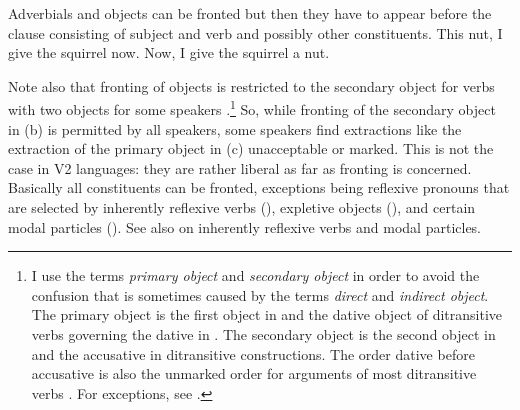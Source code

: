 \eal
{}
\zl 
Adverbials and objects can be fronted but then they have to appear before the clause consisting of
subject and verb and possibly other constituents.
\eal
\ex This nut, I give the squirrel now. 
\ex Now, I give the squirrel a nut.
\zl

Note also that fronting of objects is restricted to the secondary object for verbs with two objects
for some speakers \citep[]{Hudson92a-u}.\footnote{
  I use the terms \emph{primary object} and \emph{secondary
    object} in order to avoid the confusion that is sometimes
  caused by the terms \emph{direct} and \emph{indirect object}. The primary object is the first object in 
  and the dative object of ditransitive verbs governing the dative in . The secondary object
  is the second object in  and the accusative in  ditransitive constructions. The order
  dative before accusative is also the unmarked order for arguments of most ditransitive verbs
  \citep{Hoehle82a}. For exceptions, see .
} So, while fronting of the secondary object in
(b) is permitted by all speakers, some speakers find extractions like the extraction of the
primary object in (c) unacceptable or marked.
\vspace{-\baselineskip}
\eal
\judgewidth{\%}
\zl
This is not the case in V2 languages: they are rather liberal as far as fronting
is concerned. Basically all constituents can be fronted, exceptions being reflexive
pronouns that are selected by inherently reflexive verbs (), expletive objects (), and certain modal
particles (). See also  on inherently reflexive
verbs and modal particles.
\eal
{}
